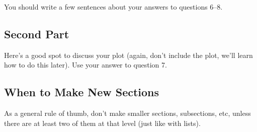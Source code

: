 \documentclass[12pt]{article}
\begin{document}
        You should write a few sentences about your answers to questions 6--8.
        
	\subsection{Second Part}
        Here's a good spot to discuss your plot (again, don't include the plot, we'll learn how to do this later).  Use your answer to question 7.
       
	\subsection{When to Make New Sections}
		As a general rule of thumb, don't make smaller sections, subsections, etc, unless there are at least two of them at that level (just like with lists).
	
\end{document}
